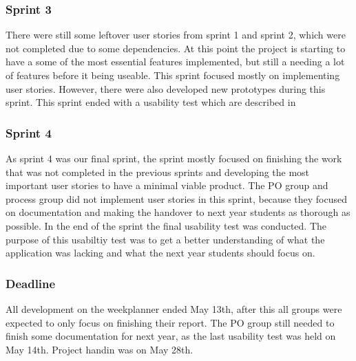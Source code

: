 \subsubsection{Sprint 3}
There were still some leftover user stories from sprint 1 and sprint 2, which were not completed due to some dependencies. 
At this point the project is starting to have a some of the most essential features implemented, but still a needing a lot of features before it being useable. 
This sprint focused mostly on implementing user stories.
However, there were also developed new prototypes during this sprint.
This sprint ended with a usability test which are described in 

\subsubsection{Sprint 4}
As sprint 4 was our final sprint, the sprint mostly focused on finishing the work that was not completed in the previous sprints and developing the most important user stories to have a minimal viable product.
The PO group and process group did not implement user stories in this sprint, because they focused on documentation and making the handover to next year students as thorough as possible.
In the end of the sprint the final usability test was conducted.
The purpose of this usabiltiy test was to get a better understanding of what the application was lacking and what the next year students should focus on.

\subsubsection{Deadline}
All development on the weekplanner ended May 13th, after this all groups were expected to only focus on finishing their report.
The PO group still needed to finish some documentation for next year, as the last usability test was held on May 14th.
Project handin was on May 28th.
